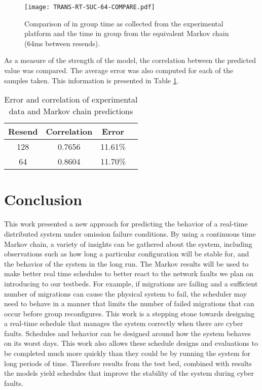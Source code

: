 \begin{figure}[!h]
\centering
\texttt{[image: TRANS-RT-SUC-64-COMPARE.pdf]}

\caption{Comparison of in group time as collected from the experimental platform and the time in group from the equivalent Markov chain (64ms between resends).}
\label{fig:COMPARE-SUC-TRANS-RT-64}
\end{figure}

As a measure of the strength of the model, the correlation between the predicted value was compared.
The average error was also computed for each of the samples taken. This information is presented in
Table \ref{tab:STAT-DATA}.

\begin{table}
\caption{Error and correlation of experimental data and Markov chain predictions}
\label{tab:STAT-DATA}
\centering
\begin{tabular}{|c||c|c|c|} 
\hline
Resend & Correlation & Error \\ \hline
128 & 0.7656 & 11.61\% \\ \hline
64 & 0.8604 & 11.70\% \\ \hline 
\end{tabular}
\end{table}

\section{Conclusion}

This work presented a new approach for predicting the behavior of a real-time
distributed system under omission failure conditions. By using a continuous time
Markov chain, a variety of insights can be gathered about the system, including
observations such as how long a particular configuration will be stable for, 
and the behavior of the system in the long run.  The Markov results will be used
 to make better real time schedules to better react to the network faults we
plan on introducing to our testbeds. For example, if migrations are failing
and a sufficient number of migrations can cause the physical system to fail,
the scheduler may need to behave in a manner that limits the number of failed
migrations that can occur before group reconfigures. This work is a stepping
stone towards designing a real-time schedule that manages the system correctly
when there are cyber faults. Schedules and behavior can be designed around how
the system behaves on its worst days. This work also allows these schedule designs
and evaluations to be completed much more quickly than they could be by running
the system for long periods of time. Therefore results from the test bed, combined
with results the models yield schedules that improve the stability of the
system during cyber faults.




